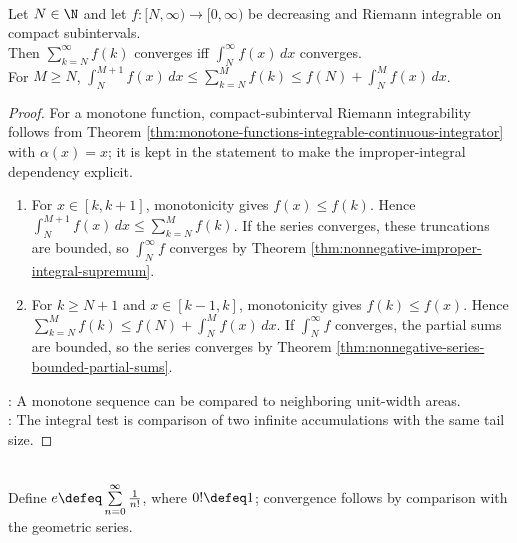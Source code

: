 \begin{theorem} \label{thm:integral-test-series} \\
Let $N\in\N$ and let $f:[N,\infty)\to[0,\infty)$ be decreasing and Riemann integrable on compact subintervals.\\
Then $\sum\limits_{k=N}^{\infty}f(k)$ converges iff $\int_N^\infty f(x)\,dx$ converges.\\
For $M\geq N$, $\int_N^{M+1} f(x)\,dx \leq \sum\limits_{k=N}^{M}f(k) \leq f(N)+\int_N^M f(x)\,dx$.
\begin{proof}
For a monotone function, compact-subinterval Riemann integrability follows from Theorem \ref{thm:monotone-functions-integrable-continuous-integrator} with $\alpha(x)=x$; it is kept in the statement to make the improper-integral dependency explicit.
\begin{enumerate}[label=\roman*.]
\setlength{\itemsep}{0pt}
\item[$(\Rightarrow)$] For $x\in[k,k+1]$, monotonicity gives $f(x)\leq f(k)$. Hence $\int_N^{M+1}f(x)\,dx\leq\sum_{k=N}^{M}f(k)$. If the series converges, these truncations are bounded, so $\int_N^\infty f$ converges by Theorem \ref{thm:nonnegative-improper-integral-supremum}.
\item[$(\Leftarrow)$] For $k\geq N+1$ and $x\in[k-1,k]$, monotonicity gives $f(k)\leq f(x)$. Hence $\sum_{k=N}^{M}f(k)\leq f(N)+\int_N^M f(x)\,dx$. If $\int_N^\infty f$ converges, the partial sums are bounded, so the series converges by Theorem \ref{thm:nonnegative-series-bounded-partial-sums}.
\end{enumerate}
: A monotone sequence can be compared to neighboring unit-width areas.\\
: The integral test is comparison of two infinite accumulations with the same tail size.
\end{proof}
\end{theorem}

\begin{definition} \label{def:number-e-by-series} \\
Define $e\defeq\sum\limits_{n=0}^{\infty}\frac{1}{n!}$, where $0!\defeq1$; convergence follows by comparison with the geometric series.
\end{definition}

